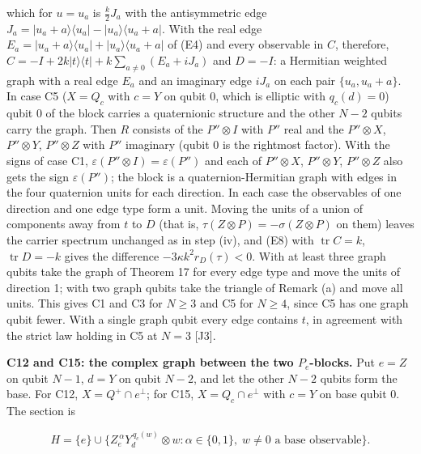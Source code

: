 \documentclass[11pt,a4paper]{article}
\newcommand{\lt}{<}
\begin{document}
which for \(u=u_a\) is \(\tfrac k2J_a\) with the antisymmetric edge
\(J_a=|u_a+a\rangle\langle u_a|-|u_a\rangle\langle u_a+a|\). With the real edge
\(E_a=|u_a+a\rangle\langle u_a|+|u_a\rangle\langle u_a+a|\) of (E4) and every observable in \(C\), therefore,
\(C=-I+2k|t\rangle\langle t|+k\sum_{a\neq0}(E_a+iJ_a)\) and \(D=-I\): a Hermitian weighted graph with a real edge
\(E_a\) and an imaginary edge \(iJ_a\) on each pair \(\{u_a,u_a+a\}\). In case C5 (\(X=Q_c\) with \(c=Y\) on
qubit 0, which is elliptic with \(q_c(d)=0\)) qubit 0 of the block carries a quaternionic structure and
the other \(N-2\) qubits carry the graph. Then \(R\) consists of the \(P''\otimes I\) with \(P''\) real and the
\(P''\otimes X\), \(P''\otimes Y\), \(P''\otimes Z\) with \(P''\) imaginary (qubit 0 is the rightmost factor). With
the signs of case C1, \(\varepsilon(P''\otimes I)=\varepsilon(P'')\) and each of \(P''\otimes X\), \(P''\otimes Y\),
\(P''\otimes Z\) also gets the sign \(\varepsilon(P'')\); the block is a quaternion-Hermitian graph with edges in
the four quaternion units for each direction. In each case the observables of one
direction and one edge type form a unit. Moving the units of a union of components away from \(t\) to
\(D\) (that is, \(\tau(Z\otimes P)=-\sigma(Z\otimes P)\) on them) leaves the carrier spectrum unchanged as in step
(iv), and (E8) with \(\operatorname{tr}C=k\), \(\operatorname{tr}D=-k\) gives the difference
\(-3\kappa k^2r_D(\tau)\lt0\). With at least three graph qubits take the graph of Theorem 17 for every edge
type and move the units of direction 1; with two graph qubits take the triangle of Remark (a) and move
all units. This gives C1 and C3 for \(N\ge3\) and C5 for \(N\ge4\), since C5 has one graph qubit fewer.
With a single graph qubit every edge contains \(t\), in agreement with the strict law holding in C5 at
\(N=3\) {[}J3{]}.

\textbf{C12 and C15: the complex graph between the two \(P_e\)-blocks.} Put \(e=Z\) on qubit \(N-1\), \(d=Y\) on
qubit \(N-2\), and let the other \(N-2\) qubits form the base. For C12, \(X=Q^+\cap e^\perp\); for C15,
\(X=Q_c\cap e^\perp\) with \(c=Y\) on base qubit 0. The section is

\[H=\{e\}\cup\{Z_e^{\,\alpha}Y_d^{\,q_c(w)}\otimes w:\alpha\in\{0,1\},\;w\neq0\text{ a base observable}\}.\]
\end{document}
